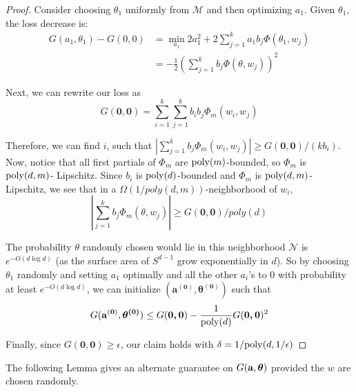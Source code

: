  \begin{proof}
  Consider choosing $\theta_1$ uniformly from $\mathcal{M}$ and then
  optimizing $a_1$. Given $\theta_1$, the loss decrease is:
%
\begin{align*}
   G(a_1,\theta_1) - G(0,0) & = \min_{a_1} 2a_1^2 +
  2\sum_{j=1}^k a_1 b_j\Phi(\theta_1,w_j) \\
 & = -\frac{1}{2}\left(  \sum_{j=1}^k b_j
   \Phi(\theta,w_j)\right)^2 
\end{align*}

Next, we can rewrite our loss as
%
\[G(\boldsymbol{0,0}) =  \sum_{i=1}^k\sum_{j=1}^k b_i b_j \Phi_m(w_i, w_j) \]

Therefore, we can find $i$, such that
$|\sum_{j=1}^k b_j \Phi_m(w_i, w_j)| \geq
G(\boldsymbol{0,0})/(kb_i)$. Now, notice that all first partials of $\Phi_m$ are $\mathrm{poly}(m)$-bounded, so $\Phi_m$ is $\mathrm{poly}(d, m)$- Lipschitz. Since $b_i$ is $\mathrm{poly}(d)$-bounded and $\Phi_m$ is $\mathrm{poly}(d,m)$-Lipschitz, we see
that in a $\Omega(1/poly(d,m))$-neighborhood of $w_i$,
%
\[|\sum_{j=1}^k b_j \Phi_m(\theta, w_j)| \geq G(\boldsymbol{0,0})/poly(d) \]

The probability $\theta$ randomly chosen would lie in this
neighborhood $\mathcal{N}$ is $e^{-O(d \log d)}$ (as the surface area of $S^{d-1}$ grow exponentially in $d$). So by choosing $\theta_1$ randomly and setting $a_1$ optimally and all the other $a_i$'s to $0$ with probability at least $e^{-O(d \log d)}$, we can initialize $(\boldsymbol{a^{(0)},\theta^{(0)}})$ such that 
%
\[G({\bf a^{(0)}, \boldsymbol{\theta^{(0)}}}) \leq G(\boldsymbol{0,0}) - \frac{1}{\mathrm{poly}(d)}G(\boldsymbol{0,0})^2\]

Finally, since $G(\boldsymbol{0,0}) \geq \epsilon$, our claim holds with $\delta = 1/\mathrm{poly}(d,1/\epsilon)$
\end{proof}
%


The following Lemma gives an alternate guarantee on $G({\bf a, \boldsymbol{\theta}})$ provided the $w$ are chosen randomly. 

 

